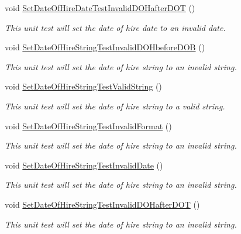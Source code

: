 \begin{DoxyCompactItemize}
void \hyperlink{class_my_all_employee_1_1_tests_1_1_parttime_employee_tests_aaca9d768d0e5b83ef1a74043417cd969}{Set\+Date\+Of\+Hire\+Date\+Test\+Invalid\+D\+O\+Hafter\+D\+O\+T} ()
\begin{DoxyCompactList}\small\item\em This unit test will set the date of hire date to an invalid date. \end{DoxyCompactList}\item 
void \hyperlink{class_my_all_employee_1_1_tests_1_1_parttime_employee_tests_ac5405b2d9ab9280666fcd50087abafb6}{Set\+Date\+Of\+Hire\+String\+Test\+Invalid\+D\+O\+Hbefore\+D\+O\+B} ()
\begin{DoxyCompactList}\small\item\em This unit test will set the date of hire string to an invalid string. \end{DoxyCompactList}\item 
void \hyperlink{class_my_all_employee_1_1_tests_1_1_parttime_employee_tests_a568d484fb9c0c9685e4520d6106253d7}{Set\+Date\+Of\+Hire\+String\+Test\+Valid\+String} ()
\begin{DoxyCompactList}\small\item\em This unit test will set the date of hire string to a valid string. \end{DoxyCompactList}\item 
void \hyperlink{class_my_all_employee_1_1_tests_1_1_parttime_employee_tests_aa0d53613837b28606160c2c147e6b909}{Set\+Date\+Of\+Hire\+String\+Test\+Invalid\+Format} ()
\begin{DoxyCompactList}\small\item\em This unit test will set the date of hire string to an invalid string. \end{DoxyCompactList}\item 
void \hyperlink{class_my_all_employee_1_1_tests_1_1_parttime_employee_tests_aadf36504af3cf262b6bb072f865d3802}{Set\+Date\+Of\+Hire\+String\+Test\+Invalid\+Date} ()
\begin{DoxyCompactList}\small\item\em This unit test will set the date of hire string to an invalid string. \end{DoxyCompactList}\item 
void \hyperlink{class_my_all_employee_1_1_tests_1_1_parttime_employee_tests_a162b58b62ab4c1107b68602b2f3a6bbc}{Set\+Date\+Of\+Hire\+String\+Test\+Invalid\+D\+O\+Hafter\+D\+O\+T} ()
\begin{DoxyCompactList}\small\item\em This unit test will set the date of hire string to an invalid string. \end{DoxyCompactList}\item 

\end{DoxyCompactItemize}
